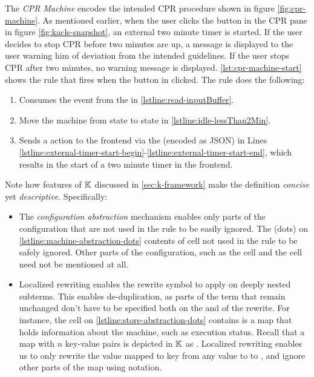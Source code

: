 The \textit{CPR Machine} encodes the intended CPR procedure
shown in figure \ref{fig:cpr-machine}. As mentioned earlier, when the user clicks
the  button in the CPR pane in figure \ref{fig:kacls-snapshot},
an external two minute timer is started. If the user decides to stop CPR before
two minutes are up, a message is displayed to the user warning him of
deviation from the intended guidelines. If the user stops CPR after
two minutes, no warning message is displayed.
\autoref{lst:cpr-machine-start} shows the rule that
fires when the  button in clicked.
The rule does the following:
\begin{enumerate}[label=(\alph*)]
  \item Consumes the  event from the  in
    \autoref{lstline:read-inputBuffer}.
  \item Move the machine from state  to state 
    in \autoref{lstline:idle-lessThan2Min}.
  \item Sends a  action to the frontend via the
     (encoded as JSON) in
    Lines \ref{lstline:external-timer-start-begin}-\ref{lstline:external-timer-start-end},
    which results in the start of a two minute timer in the frontend.
\end{enumerate}
Note how features of $\mathbb{K}$ discussed in \autoref{sec:k-framework}
make the definition \emph{concise} yet \emph{descriptive}. Specifically:
\begin{itemize}
  \item The \emph{configuration abstraction} mechanism enables only parts of the
  configuration that are not used in the rule to be easily ignored.
    The  (dots) on
    \autoref{lstline:machine-abstraction-dots} contents of cell
    not used in the rule to be safely ignored. Other parts
    of the configuration, such as the  cell
    and the  cell need not be mentioned at all.
  \item Localized rewriting enables the rewrite symbol \inlinek{=>} to
    apply on deeply nested subterms. This enables de-duplication,
    as parts of the term that remain unchanged don't have to be
    specified both on the \LHS{} and \RHS{} of the rewrite. For instance,
    the  cell on \autoref{lstline:store-abstraction-dots}
    contains is a map that holds information about the machine, such as
    execution status. Recall that a map with $n$ key-value pairs is
    depicted in $\mathbb{K}$ as
    . Localized rewriting enables us to only rewrite the
    value mapped to key  from any value to
    to \inlinek{true}, and ignore other parts of the map using 
    notation.
\end{itemize}
